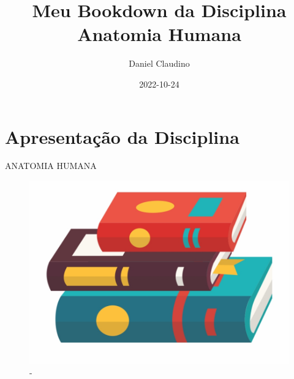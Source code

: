 \documentclass[
]{book}
\title{Meu Bookdown da Disciplina Anatomia Humana}
\author{Daniel Claudino}
\date{2022-10-24}
\begin{document}
\maketitle

{
\setcounter{tocdepth}{1}
\tableofcontents
}
\hypertarget{apresentauxe7uxe3o-da-disciplina}{%
\chapter{Apresentação da Disciplina}\label{apresentauxe7uxe3o-da-disciplina}}

ANATOMIA HUMANA

\begin{figure}

{\centering \includegraphics[width=0.5\linewidth]{figuras/LIVRO-GENERICO} 

}

\caption{-}\label{fig:unnamed-chunk-1}
\end{figure}
\end{document}
